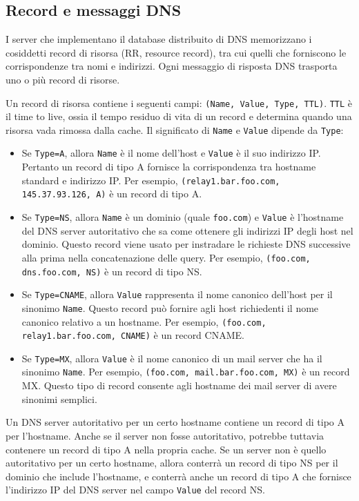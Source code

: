 \subsection{Record e messaggi DNS}
I server che implementano il database distribuito di DNS memorizzano i cosiddetti record di risorsa (RR, resource record), tra cui quelli che forniscono le corrispondenze tra nomi e indirizzi. Ogni messaggio di risposta DNS trasporta uno o più record di risorse.

Un record di risorsa contiene i seguenti campi: \verb|(Name, Value, Type, TTL)|. \verb|TTL| è il time to live, ossia il tempo residuo di vita di un record e determina quando una risorsa vada rimossa dalla cache. Il significato di \verb|Name| e \verb|Value| dipende da \verb|Type|:
\begin{itemize}
    \item Se \verb|Type=A|, allora \verb|Name| è il nome dell'host e \verb|Value| è il suo indirizzo IP. Pertanto un record di tipo A fornisce la corrispondenza tra hostname standard e indirizzo IP. Per esempio, \texttt{(relay1.bar.foo.com, 145.37.93.126, A)} è un record di tipo A.
    \item Se \verb|Type=NS|, allora \verb|Name| è un dominio (quale \verb|foo.com|) e \verb|Value| è l'hostname del DNS server autoritativo che sa come ottenere gli indirizzi IP degli host nel dominio. Questo record viene usato per instradare le richieste DNS successive alla prima nella concatenazione delle query. Per esempio, \texttt{(foo.com, dns.foo.com, NS)} è un record di tipo NS.
    \item Se \verb|Type=CNAME|, allora \verb|Value| rappresenta il nome canonico dell'host per il sinonimo \verb|Name|. Questo record può fornire agli host richiedenti il nome canonico relativo a un hostname. Per esempio, \texttt{(foo.com, relay1.bar.foo.com, CNAME)} è un record CNAME.
    \item Se \verb|Type=MX|, allora \verb|Value| è il nome canonico di un mail server che ha il sinonimo \verb|Name|. Per esempio, \texttt{(foo.com, mail.bar.foo.com, MX)} è un record MX. Questo tipo di record consente agli hostname dei mail server di avere sinonimi semplici.
\end{itemize}

Un DNS server autoritativo per un certo hostname contiene un record di tipo A per l'hostname. Anche se il server non fosse autoritativo, potrebbe tuttavia contenere un record di tipo A nella propria cache. Se un server non è quello autoritativo per un certo hostname, allora conterrà un record di tipo NS per il dominio che include l'hostname, e conterrà anche un record di tipo A che fornisce l'indirizzo IP del DNS server nel campo \verb|Value| del record NS. 

